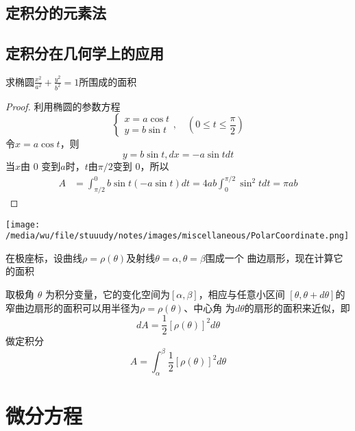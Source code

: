 \documentclass[11pt]{article}
\begin{document}
\subsection{定积分的元素法}
\label{sec:org4dc997e}
\subsection{定积分在几何学上的应用}
\label{sec:orgf96f794}
\begin{examplle}[]
求椭圆\(\frac{x^2}{a^2}+\frac{y^2}{b^2}=1\)所围成的面积
\end{examplle}

\begin{proof}
利用椭圆的参数方程
\begin{equation*}
\begin{cases}
x=a\cos t \\
y=b\sin t
\end{cases},\quad (0\le t\le\frac{\pi}{2})
\end{equation*}
令\(x=a\cos t\)，则
\begin{equation*}
y=b\sin t,dx=-a\sin t dt
\end{equation*}
当\(x\)由 0 变到\(a\)时，\(t\)由\(\pi/2\)变到 0，所以
\begin{align*}
A&=\int_{\pi/2}^0b\sin t(-a\sin t)dt=4ab\int_0^{\pi/2}\sin^2tdt=\pi ab
\end{align*}
\end{proof}

\begin{center}
\texttt{[image: /media/wu/file/stuuudy/notes/images/miscellaneous/PolarCoordinate.png]}
\end{center}

在极座标，设曲线\(\rho=\rho(\theta)\)及射线\(\theta=\alpha,\theta=\beta\)围成一个
曲边扇形，现在计算它的面积

取极角 \(\theta\) 为积分变量，它的变化空间为\([\alpha,\beta]\)，相应与任意小区间
\([\theta,\theta+d\theta]\)的窄曲边扇形的面积可以用半径为\(\rho=\rho(\theta)\)、中心角
为\(d\theta\)的扇形的面积来近似，即
\begin{equation*}
dA=\frac{1}{2}[\rho(\theta)]^2d\theta
\end{equation*}
做定积分
\begin{equation*}
A=\int_\alpha^\beta\frac{1}{2}[\rho(\theta)]^2d\theta
\end{equation*}
\section{微分方程}
\label{sec:org8393130}
\end{document}
